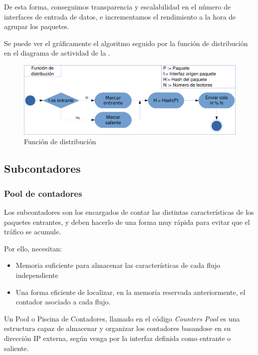 De esta forma, conseguimos transparencia y escalabilidad en el número de interfaces de entrada de datos, e 
incrementamos el rendimiento a la hora de agrupar los paquetes.

Se puede ver el gráficamente el algoritmo seguido por la función de distribución en el diagrama de actividad de la 
.

\begin{figure}[htbp]
\centering
\includegraphics[width=\textwidth]{CapituloEstructura/Figuras/ActividadFuncionDistribucionCluster-crop}
\caption{Función de distribución}
\end{figure}
%

\subsection{Subcontadores}
\subsubsection{Pool de contadores}
Los subcontadores son los encargados de contar las distintas características de los paquetes entrantes, y deben hacerlo 
de una forma muy rápida para evitar que el tráfico se acumule.

Por ello, necesitan:
\begin{itemize}
 \item Memoria suficiente para almacenar las características de cada flujo independiente
 \item Una forma eficiente de localizar, en la memoria reservada anteriormente, el contador asociado a cada flujo.
\end{itemize}

Un Pool o Piscina de Contadores, llamado en el código \emph{Counters Pool} es una 
estructura capaz de almacenar y organizar los contadores basandose en su dirección IP externa, según venga por la 
interfaz definida como entrante o saliente.

